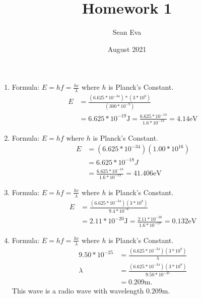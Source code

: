 \documentclass{article}
\title{Homework 1}
\author{Sean Eva}
\date{August 2021}
\begin{document}
\maketitle

\begin{enumerate}
    \item 
    
    Formula: $E=hf=\frac{hc}{\lambda}$ where $h$ is Planck's Constant.\\
    \begin{align*}
        E &= \frac{(6.625*10^{-34})*(3*10^8)}{(300*10^{-9})}\\
        &= 6.625*10^{-19}\text{J} = \frac{6.625*10^{-19}}{1.6*10^{-19}} = 4.14 \text{eV}
    \end{align*}
    
    \item
    
    Formula: $E=hf$ where $h$ is Planck's Constant.\\
    \begin{align*}
        E &= (6.625*10^{-34})(1.00*10^{16})\\
        &= 6.625*10^{-18}J\\
        &= \frac{6.625*10^{-18}}{1.6*10^{-19}} = 41.406 \text{eV}
    \end{align*}
    
    \item
    
    Formula: $E=hf=\frac{hc}{\lambda}$ where $h$ is Planck's Constant.\\
    \begin{align*}
        E &= \frac{(6.625*10^{-34})(3*10^8)}{9.4*10^{-6}}\\
        &= 2.11*10^{-20} \text{J} = \frac{2.11*10^{-20}}{1.6*10^{-19}} = 0.132 \text{eV}
    \end{align*}
    
    \item
    
    Formula: $E=hf=\frac{hc}{\lambda}$ where $h$ is Planck's Constant.\\
    \begin{align*}
    9.50*10^{-25} &= \frac{(6.625*10^{-34})(3*10^8)}{\lambda}\\
    \lambda &= \frac{(6.625*10^{-34})(3*10^8)}{9.50*10^{-25}}\\
    &= 0.209 \text{m}.
    \end{align*}
    This wave is a radio wave with wavelength $0.209$m.
    

\end{enumerate}
\end{document}
